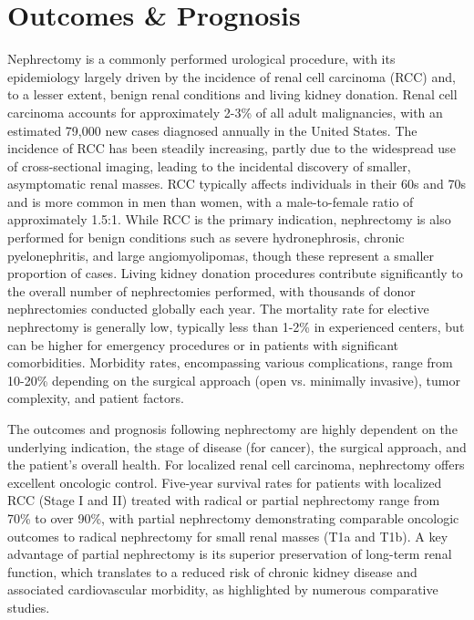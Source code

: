 \section*{Outcomes \& Prognosis}
Nephrectomy is a commonly performed urological procedure, with its epidemiology largely driven by the incidence of renal cell carcinoma (RCC) and, to a lesser extent, benign renal conditions and living kidney donation. Renal cell carcinoma accounts for approximately 2-3\% of all adult malignancies, with an estimated 79,000 new cases diagnosed annually in the United States. The incidence of RCC has been steadily increasing, partly due to the widespread use of cross-sectional imaging, leading to the incidental discovery of smaller, asymptomatic renal masses. RCC typically affects individuals in their 60s and 70s and is more common in men than women, with a male-to-female ratio of approximately 1.5:1. While RCC is the primary indication, nephrectomy is also performed for benign conditions such as severe hydronephrosis, chronic pyelonephritis, and large angiomyolipomas, though these represent a smaller proportion of cases. Living kidney donation procedures contribute significantly to the overall number of nephrectomies performed, with thousands of donor nephrectomies conducted globally each year. The mortality rate for elective nephrectomy is generally low, typically less than 1-2\% in experienced centers, but can be higher for emergency procedures or in patients with significant comorbidities. Morbidity rates, encompassing various complications, range from 10-20\% depending on the surgical approach (open vs. minimally invasive), tumor complexity, and patient factors.

The outcomes and prognosis following nephrectomy are highly dependent on the underlying indication, the stage of disease (for cancer), the surgical approach, and the patient's overall health. For localized renal cell carcinoma, nephrectomy offers excellent oncologic control. Five-year survival rates for patients with localized RCC (Stage I and II) treated with radical or partial nephrectomy range from 70\% to over 90\%, with partial nephrectomy demonstrating comparable oncologic outcomes to radical nephrectomy for small renal masses (T1a and T1b). A key advantage of partial nephrectomy is its superior preservation of long-term renal function, which translates to a reduced risk of chronic kidney disease and associated cardiovascular morbidity, as highlighted by numerous comparative studies.

